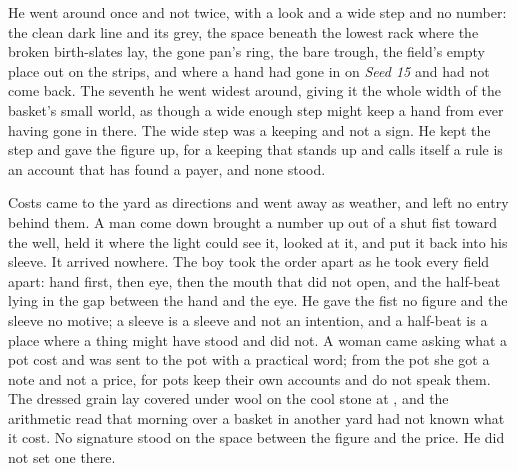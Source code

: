 He went around  once and not twice, with a look and a wide step and no number: the clean dark line and its grey, the space beneath the lowest rack where the broken birth-slates lay, the gone pan's ring, the bare trough, the field's empty place out on the strips, and  where a hand had gone in on \emph{Seed 15} and had not come back. The seventh he went widest around, giving it the whole width of the basket's small world, as though a wide enough step might keep a hand from ever having gone in there. The wide step was a keeping and not a sign. He kept the step and gave the figure up, for a keeping that stands up and calls itself a rule is an account that has found a payer, and none stood.

Costs came to the yard as directions and went away as weather, and left no entry behind them. A man come down  brought a number up out of a shut fist toward the well, held it where the light could see it, looked at it, and put it back into his sleeve. It arrived nowhere. The boy took the order apart as he took every field apart: hand first, then eye, then the mouth that did not open, and the half-beat lying in the gap between the hand and the eye. He gave the fist no figure and the sleeve no motive; a sleeve is a sleeve and not an intention, and a half-beat is a place where a thing might have stood and did not. A woman came asking what a pot cost and was sent to the pot with a practical word; from the pot she got a note and not a price, for pots keep their own accounts and do not speak them. The dressed grain lay covered under wool on the cool stone at , and the arithmetic read that morning over a basket in another yard had not known what it cost. No signature stood on the space between the figure and the price. He did not set one there.

